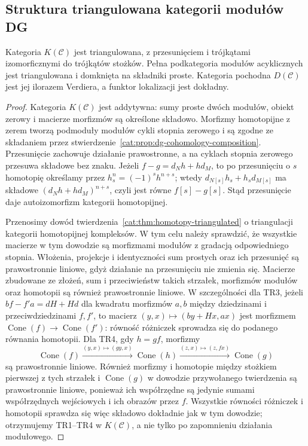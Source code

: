 \subsection{Struktura triangulowana kategorii modułów DG}

\begin{twierdzenie}\label{cat:thm:dg-module-triangulated}
Kategoria $K(\mathcal C)$ jest triangulowana, z przesunięciem i trójkątami izomorficznymi do trójkątów stożków. Pełna podkategoria modułów acyklicznych jest triangulowana i domknięta na składniki proste. Kategoria pochodna $D(\mathcal C)$ jest jej ilorazem Verdiera, a funktor lokalizacji jest dokładny.
\end{twierdzenie}
\begin{proof}
Kategoria $K(\mathcal C)$ jest addytywna: sumy proste dwóch modułów, obiekt zerowy i macierze morfizmów są określone składowo. Morfizmy homotopijne z zerem tworzą podmoduły modułów cykli stopnia zerowego i są zgodne ze składaniem przez stwierdzenie~\ref{cat:prop:dg-cohomology-composition}. Przesunięcie zachowuje działanie prawostronne, a na cyklach stopnia zerowego przesuwa składowe bez znaku. Jeżeli $f-g=d_Nh+hd_M$, to po przesunięciu o $s$ homotopię określamy przez $h_s^n=(-1)^s h^{n+s}$; wtedy $d_{N[s]}h_s+h_sd_{M[s]}$ ma składowe $(d_Nh+hd_M)^{n+s}$, czyli jest równe $f[s]-g[s]$. Stąd przesunięcie daje autoizomorfizm kategorii homotopijnej.

Przenosimy dowód twierdzenia~\ref{cat:thm:homotopy-triangulated} o triangulacji kategorii homotopijnej kompleksów. W tym celu należy sprawdzić, że wszystkie macierze w tym dowodzie są morfizmami modułów z gradacją odpowiedniego stopnia. Włożenia, projekcje i identyczności sum prostych oraz ich przesunięć są prawostronnie liniowe, gdyż działanie na przesunięciu nie zmienia się. Macierze zbudowane ze złożeń, sum i przeciwieństw takich strzałek, morfizmów modułów oraz homotopii są również prawostronnie liniowe. W szczególności dla TR3, jeżeli $b f-f'a=dH+Hd$ dla kwadratu morfizmów $a,b$ między dziedzinami i przeciwdziedzinami $f,f'$, to macierz $(y,x)\mapsto(by+Hx,ax)$ jest morfizmem $\operatorname{Cone}(f)\to\operatorname{Cone}(f')$: równość różniczek sprowadza się do podanego równania homotopii. Dla TR4, gdy $h=gf$, morfizmy
\[
 \operatorname{Cone}(f)\xrightarrow{(y,x)\mapsto(gy,x)}
 \operatorname{Cone}(h)\xrightarrow{(z,x)\mapsto(z,fx)}
 \operatorname{Cone}(g)
\]
są prawostronnie liniowe. Również morfizmy i homotopie między stożkiem pierwszej z tych strzałek i $\operatorname{Cone}(g)$ w dowodzie przywołanego twierdzenia są prawostronnie liniowe, ponieważ ich współrzędne są jedynie sumami współrzędnych wejściowych i ich obrazów przez $f$. Wszystkie równości różniczek i homotopii sprawdza się więc składowo dokładnie jak w tym dowodzie; otrzymujemy TR1--TR4 w $K(\mathcal C)$, a nie tylko po zapomnieniu działania modułowego.


\end{proof}
